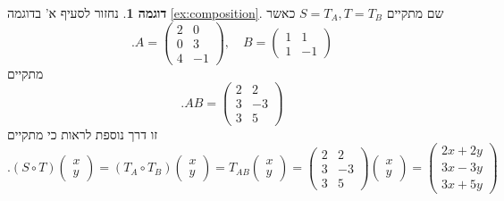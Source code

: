 \documentclass[12pt]{report}
\theoremstyle{plain}
\theoremstyle{definition}
\newtheorem{example}{דוגמה}[chapter]
\newcommand{\0}{\mathbf{0}}
\begin{document}
\begin{example}
נחזור לסעיף א' בדוגמה
\ref{ex:composition}.
שם מתקיים
$S=T_A,T=T_B$
כאשר
$$
.A=\begin{pmatrix}
2 & 0 \\
0 & 3 \\
4 & -1
\end{pmatrix},\quad B=\begin{pmatrix}
1 & 1 \\
1 & -1
\end{pmatrix}
$$
מתקיים
$$
.AB=\begin{pmatrix}
2 & 2 \\
3 & -3 \\
3 & 5
\end{pmatrix}
$$
זו דרך נוספת לראות כי מתקיים
$$
.(S\circ T)\begin{pmatrix}x\\y\end{pmatrix}=(T_A\circ T_B)\begin{pmatrix}x\\y\end{pmatrix}=T_{AB}\begin{pmatrix}x\\y\end{pmatrix}=\begin{pmatrix}
2 & 2 \\
3 & -3 \\
3 & 5
\end{pmatrix}\begin{pmatrix}x\\y\end{pmatrix}=\begin{pmatrix}2x+2y\\3x-3y\\3x+5y\end{pmatrix}
$$

\end{example}
\end{document}
